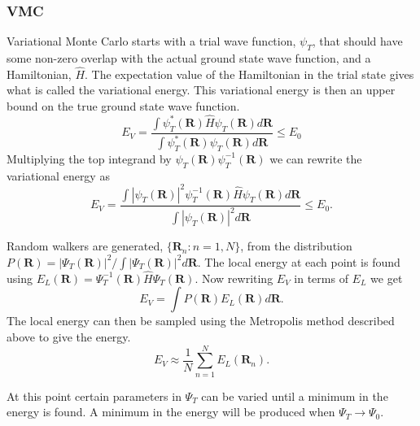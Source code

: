 \subsubsection{VMC}
Variational Monte Carlo starts with a trial wave function, $\psi_T$, that should have some non-zero overlap with the actual ground state wave function, and a Hamiltonian, $\hat{H}$. The expectation value of the Hamiltonian in the trial state gives what is called the variational energy. This variational energy is then an upper bound on the true ground state wave function.
\begin{equation}
   E_V = \frac{\int\psi_T^*(\mathbf{R})\hat{H}\psi_T(\mathbf{R})d\mathbf{R}}{\int\psi_T^*(\mathbf{R})\psi_T(\mathbf{R})d\mathbf{R}} \le E_0
\end{equation}
Multiplying the top integrand by $\psi_T(\mathbf{R})\psi_T^{-1}(\mathbf{R})$ we can rewrite the variational energy as
\begin{equation}
   E_V = \frac{\int\left|\psi_T(\mathbf{R})\right|^2\psi_T^{-1}(\mathbf{R})\hat{H}\psi_T(\mathbf{R})d\mathbf{R}}{\int\left|\psi_T(\mathbf{R})\right|^2d\mathbf{R}} \le E_0.
\end{equation}

Random walkers are generated, $\{\mathbf{R}_n: n=1,N\}$, from the distribution $P(\mathbf{R}) = |\Psi_T(\mathbf{R})|^2/\int|\Psi_T(\mathbf{R})|^2d\mathbf{R}$. The local energy at each point is found using $E_L(\mathbf{R}) = \Psi_T^{-1}(\mathbf{R}) \hat{H} \Psi_T(\mathbf{R})$. Now rewriting $E_V$ in terms of $E_L$ we get 
\begin{equation} 
  E_V = \int P(\mathbf{R}) E_L(\mathbf{R}) d\mathbf{R}. 
\end{equation} 
The local energy can then be sampled using the Metropolis method described above to give the energy. 
\begin{equation} 
  E_V \approx \frac{1}{N} \sum\limits_{n=1}^N E_L({\mathbf{R}_n}). 
\end{equation} 
 
At this point certain parameters in $\Psi_T$ can be varied until a minimum in the energy is found. A minimum in the energy will be produced when $\Psi_T \rightarrow \Psi_0$.

